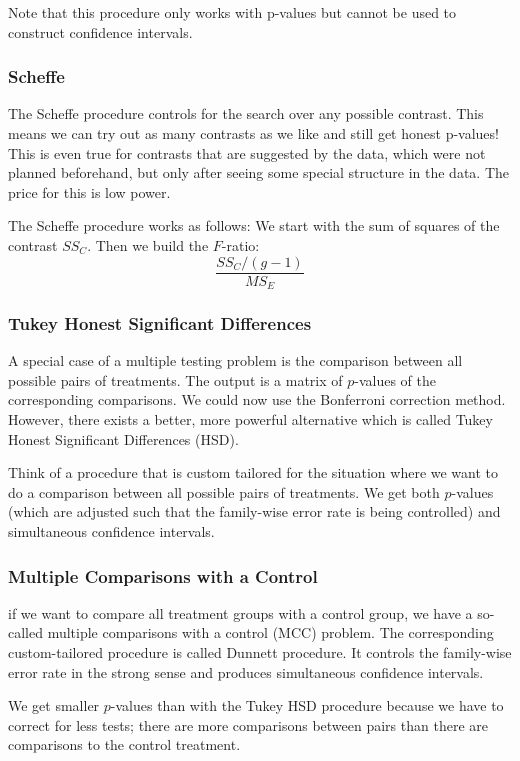Note that this procedure only works with p-values but cannot be used to construct confidence intervals.

\subsubsection{Scheffe}

The Scheffe procedure controls for the search over any possible contrast. This means we can try out as many contrasts as we like and still get honest p-values! This is even true for contrasts that are suggested by the data, which were not planned beforehand, but only after seeing some special structure in the data. The price for this is low power. \medskip

The Scheffe procedure works as follows: We start with the sum of squares of the contrast $SS_C$. Then we build the $F$-ratio:
$$\frac{SS_C/(g-1)}{MS_E}$$

\subsubsection{Tukey Honest Significant Differences}

A special case of a multiple testing problem is the comparison between all possible pairs of treatments. The output is a matrix of $p$-values of the corresponding comparisons. We could now use the Bonferroni correction method. However, there exists a better, more powerful alternative which is called Tukey Honest Significant Differences (HSD). \medskip

Think of a procedure that is custom tailored for the situation where we want to do a comparison between all possible pairs of treatments. We get both $p$-values (which are adjusted such that the family-wise error rate is being controlled) and simultaneous confidence intervals.

\subsubsection{Multiple Comparisons with a Control}

 if we want to compare all treatment groups with a control group, we have a so-called multiple comparisons with a control (MCC) problem. The corresponding custom-tailored procedure is called Dunnett procedure. It controls the family-wise error rate in the strong sense and produces simultaneous confidence intervals. \medskip
 
 We get smaller $p$-values than with the Tukey HSD procedure because we have to correct for less tests; there are more comparisons between pairs than there are comparisons to the control treatment.
